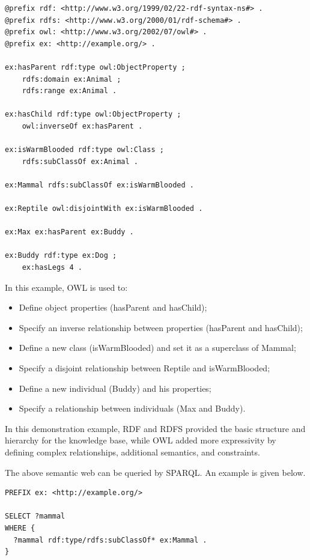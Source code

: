 \begin{mdframed}
\begin{lstlisting}
@prefix rdf: <http://www.w3.org/1999/02/22-rdf-syntax-ns#> .
@prefix rdfs: <http://www.w3.org/2000/01/rdf-schema#> .
@prefix owl: <http://www.w3.org/2002/07/owl#> .
@prefix ex: <http://example.org/> .

ex:hasParent rdf:type owl:ObjectProperty ;
    rdfs:domain ex:Animal ;
    rdfs:range ex:Animal .

ex:hasChild rdf:type owl:ObjectProperty ;
    owl:inverseOf ex:hasParent .

ex:isWarmBlooded rdf:type owl:Class ;
    rdfs:subClassOf ex:Animal .

ex:Mammal rdfs:subClassOf ex:isWarmBlooded .

ex:Reptile owl:disjointWith ex:isWarmBlooded .

ex:Max ex:hasParent ex:Buddy .

ex:Buddy rdf:type ex:Dog ;
    ex:hasLegs 4 .
\end{lstlisting}

In this example, OWL is used to:
\begin{itemize}
  \item Define object properties (hasParent and hasChild);
  \item Specify an inverse relationship between properties (hasParent and hasChild);
  \item Define a new class (isWarmBlooded) and set it as a superclass of Mammal;
  \item Specify a disjoint relationship between Reptile and isWarmBlooded;
  \item Define a new individual (Buddy) and his properties;
  \item Specify a relationship between individuals (Max and Buddy).
\end{itemize}

In this demonstration example, RDF and RDFS provided the basic structure and hierarchy for the knowledge base, while OWL added more expressivity by defining complex relationships, additional semantics, and constraints.

The above semantic web can be queried by SPARQL. An example is given below.

\begin{lstlisting}
PREFIX ex: <http://example.org/>

SELECT ?mammal
WHERE {
  ?mammal rdf:type/rdfs:subClassOf* ex:Mammal .
}
\end{lstlisting}

\end{mdframed}

